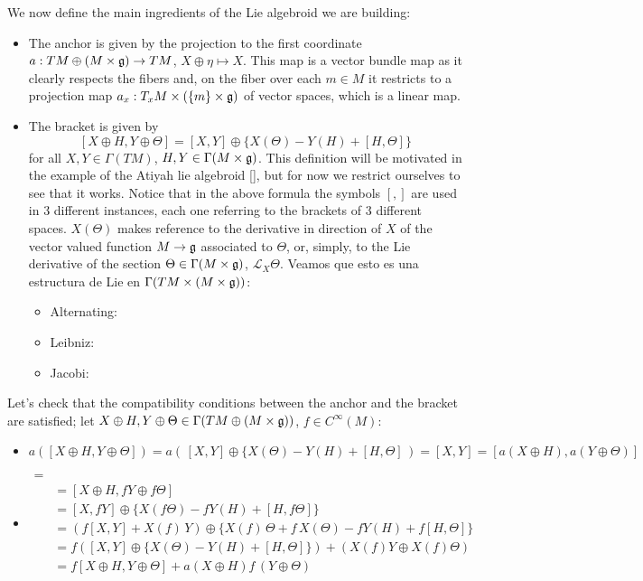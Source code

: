 We now define the main ingredients of the Lie algebroid we are building:
    \begin{itemize}
    \item The anchor is given by the projection to the first coordinate $a: TM \oplus (M \times \mathfrak{g}) \to TM$, $X \oplus \eta \mapsto X$. This map is a vector bundle map as it clearly respects the fibers and, on the fiber over each $m\in M$ it restricts to  a projection map $a_x:T_x M \times (\{m\}\times \mathfrak{g})$ of vector spaces, which is a linear map.
    
    \item The bracket is given by 
    \[
        [X \oplus H, Y \oplus \Theta] = [X, Y] \oplus \{X(\Theta) - Y(H) + [H, \Theta]\}
    \]
    for all $X, Y \in \Gamma(TM)$, $H, Y \in \Gamma(M \times \mathfrak{g})$. This definition will be motivated in the example of the Atiyah lie algebroid \ref{}, but for now we restrict ourselves to see that it works. Notice that in the above formula the symbols $[,]$ are used in $3$ different instances, each one referring to the brackets of $3$ different spaces. $X(\Theta)$ makes reference to the derivative in direction of $X$ of the vector valued function $M \to \mathfrak{g}$ associated to $\Theta$, or, simply, to the Lie derivative of the section $\Theta \in \Gamma(M \times \mathfrak{g})$, $\mathcal L_X \Theta$. Veamos que esto es una estructura de Lie en $\Gamma(TM \times (M \times \mathfrak{g}))$:
        \begin{itemize}
        \item Alternating:
        \item Leibniz:
        \item Jacobi:
        \end{itemize}
    \end{itemize}

Let's check that the compatibility conditions between the anchor and the bracket are satisfied; let $X \oplus H, Y \oplus \Theta \in \Gamma(TM \oplus (M \times \mathfrak{g}))$, $f \in C^\infty(M)$:

    \begin{itemize}
    \item $a([X \oplus H, Y \oplus \Theta]) = a(\, [X, Y] \oplus \{X(\Theta) - Y(H) + [H, \Theta] \,) = [X, Y] = [a(X \oplus H), a(Y \oplus \Theta)]$
    
    \item 
    \begin{align*}
        [X \oplus H, &f\cdot (Y \oplus \Theta)] =\\
        &= [X \oplus H, fY \oplus f\Theta] \\
        &=  [X, fY] \oplus \{X(f\Theta) - fY(H) + [H, f\Theta]\} \\
        &= (f[X, Y] + X(f)\,Y) \oplus \{X(f)\,\Theta + f\,X(\Theta) - fY(H) + f[H, \Theta]\} \\
        &=f([X, Y] \oplus \{ X(\Theta) -Y(H) + [H, \Theta]\} ) + (X(f) Y \oplus X(f)\Theta) \\
        &= f[X \oplus H, Y \oplus \Theta] + a(X \oplus H)f \, (Y \oplus \Theta)
    \end{align*}
    \end{itemize}

